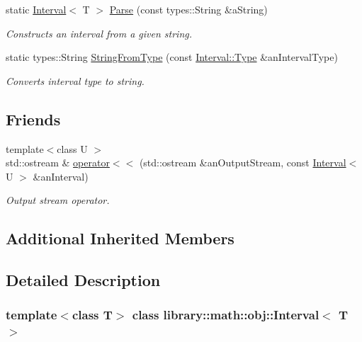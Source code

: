 \begin{DoxyCompactItemize}
static \hyperlink{classlibrary_1_1math_1_1obj_1_1_interval}{Interval}$<$ T $>$ \hyperlink{classlibrary_1_1math_1_1obj_1_1_interval_a9ed15c38ee04880a1aba75defa086a79}{Parse} (const types\+::\+String \&a\+String)
\begin{DoxyCompactList}\small\item\em Constructs an interval from a given string. \end{DoxyCompactList}\item 
static types\+::\+String \hyperlink{classlibrary_1_1math_1_1obj_1_1_interval_a64a1850152db9b95c9824c71378d9f40}{String\+From\+Type} (const \hyperlink{classlibrary_1_1math_1_1obj_1_1_interval_base_aabce6fa07a6e2e8fd3fcab5fd0d317d6}{Interval\+::\+Type} \&an\+Interval\+Type)
\begin{DoxyCompactList}\small\item\em Converts interval type to string. \end{DoxyCompactList}\end{DoxyCompactItemize}
\subsection*{Friends}
\begin{DoxyCompactItemize}
\item 
{\footnotesize template$<$class U $>$ }\\std\+::ostream \& \hyperlink{classlibrary_1_1math_1_1obj_1_1_interval_a3aa32afa8cb5d85eeb45540b0bf5657b}{operator$<$$<$} (std\+::ostream \&an\+Output\+Stream, const \hyperlink{classlibrary_1_1math_1_1obj_1_1_interval}{Interval}$<$ U $>$ \&an\+Interval)
\begin{DoxyCompactList}\small\item\em Output stream operator. \end{DoxyCompactList}\end{DoxyCompactItemize}
\subsection*{Additional Inherited Members}


\subsection{Detailed Description}
\subsubsection*{template$<$class T$>$\newline
class library\+::math\+::obj\+::\+Interval$<$ T $>$}


